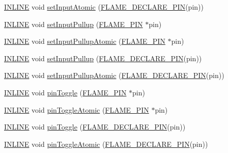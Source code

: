 \begin{DoxyCompactItemize}
\item 
\hyperlink{io_8h_a2eb6f9e0395b47b8d5e3eeae4fe0c116}{I\-N\-L\-I\-N\-E} void \hyperlink{namespaceflame_aed13242fd777bd80c5cf749a09defa6f}{set\-Input\-Atomic} (\hyperlink{io_8h_ab54f3ca5cc36256b922289e8e92316a3}{F\-L\-A\-M\-E\-\_\-\-D\-E\-C\-L\-A\-R\-E\-\_\-\-P\-I\-N}(pin))
\item 
\hyperlink{io_8h_a2eb6f9e0395b47b8d5e3eeae4fe0c116}{I\-N\-L\-I\-N\-E} void \hyperlink{namespaceflame_a3bda4e681837e0382d7f798edc17096f}{set\-Input\-Pullup} (\hyperlink{namespaceflame_ae345f4de995f89125721dd4f5cd4cd9f}{F\-L\-A\-M\-E\-\_\-\-P\-I\-N} $\ast$pin)
\item 
\hyperlink{io_8h_a2eb6f9e0395b47b8d5e3eeae4fe0c116}{I\-N\-L\-I\-N\-E} void \hyperlink{namespaceflame_a0a91148dbcc6eddf97d8b65c0b9df48d}{set\-Input\-Pullup\-Atomic} (\hyperlink{namespaceflame_ae345f4de995f89125721dd4f5cd4cd9f}{F\-L\-A\-M\-E\-\_\-\-P\-I\-N} $\ast$pin)
\item 
\hyperlink{io_8h_a2eb6f9e0395b47b8d5e3eeae4fe0c116}{I\-N\-L\-I\-N\-E} void \hyperlink{namespaceflame_a31ad2fe3678c4823e4fa997f92355f53}{set\-Input\-Pullup} (\hyperlink{io_8h_ab54f3ca5cc36256b922289e8e92316a3}{F\-L\-A\-M\-E\-\_\-\-D\-E\-C\-L\-A\-R\-E\-\_\-\-P\-I\-N}(pin))
\item 
\hyperlink{io_8h_a2eb6f9e0395b47b8d5e3eeae4fe0c116}{I\-N\-L\-I\-N\-E} void \hyperlink{namespaceflame_ae63d83be8310be7130b3c736231600a7}{set\-Input\-Pullup\-Atomic} (\hyperlink{io_8h_ab54f3ca5cc36256b922289e8e92316a3}{F\-L\-A\-M\-E\-\_\-\-D\-E\-C\-L\-A\-R\-E\-\_\-\-P\-I\-N}(pin))
\item 
\hyperlink{io_8h_a2eb6f9e0395b47b8d5e3eeae4fe0c116}{I\-N\-L\-I\-N\-E} void \hyperlink{namespaceflame_ad7e62514c1b8312c2b63f2dac2e854bf}{pin\-Toggle} (\hyperlink{namespaceflame_ae345f4de995f89125721dd4f5cd4cd9f}{F\-L\-A\-M\-E\-\_\-\-P\-I\-N} $\ast$pin)
\item 
\hyperlink{io_8h_a2eb6f9e0395b47b8d5e3eeae4fe0c116}{I\-N\-L\-I\-N\-E} void \hyperlink{namespaceflame_ac7cccfa25b7ea382a021ebce7a48de8e}{pin\-Toggle\-Atomic} (\hyperlink{namespaceflame_ae345f4de995f89125721dd4f5cd4cd9f}{F\-L\-A\-M\-E\-\_\-\-P\-I\-N} $\ast$pin)
\item 
\hyperlink{io_8h_a2eb6f9e0395b47b8d5e3eeae4fe0c116}{I\-N\-L\-I\-N\-E} void \hyperlink{namespaceflame_aacc4826d26c101e8dc6f9fc2049d147f}{pin\-Toggle} (\hyperlink{io_8h_ab54f3ca5cc36256b922289e8e92316a3}{F\-L\-A\-M\-E\-\_\-\-D\-E\-C\-L\-A\-R\-E\-\_\-\-P\-I\-N}(pin))
\item 
\hyperlink{io_8h_a2eb6f9e0395b47b8d5e3eeae4fe0c116}{I\-N\-L\-I\-N\-E} void \hyperlink{namespaceflame_a1150ab7687403688ca969672f066fdc9}{pin\-Toggle\-Atomic} (\hyperlink{io_8h_ab54f3ca5cc36256b922289e8e92316a3}{F\-L\-A\-M\-E\-\_\-\-D\-E\-C\-L\-A\-R\-E\-\_\-\-P\-I\-N}(pin))

\end{DoxyCompactItemize}
